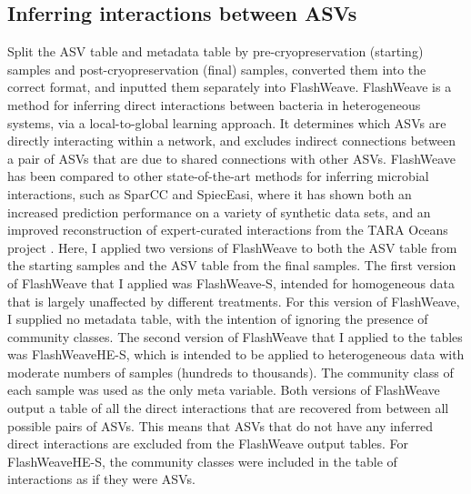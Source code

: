 \documentclass{article}
\begin{document}
\subsection{Inferring interactions between ASVs}
Split the ASV table and metadata table by pre-cryopreservation (starting) samples and post-cryopreservation (final) samples, converted them into the correct format, and inputted them separately into FlashWeave. FlashWeave is a method for inferring direct interactions between bacteria in heterogeneous systems, via a local-to-global learning approach. It determines which ASVs are directly interacting within a network, and excludes indirect connections between a pair of ASVs that are due to shared connections with other ASVs. FlashWeave has been compared to other state-of-the-art methods for inferring microbial interactions, such as SparCC and SpiecEasi, where it has shown both an increased prediction performance on a variety of synthetic data sets, and an improved reconstruction of expert-curated interactions from the TARA Oceans project \citep{TACKMANN2019286}. 
Here, I applied two versions of FlashWeave to both the ASV table from the starting samples and the ASV table from the final samples. The first version of FlashWeave that I applied was FlashWeave-S, intended for homogeneous data that is largely unaffected by different treatments. For this version of FlashWeave, I supplied no metadata table, with the intention of ignoring the presence of community classes. The second version of FlashWeave that I applied to the tables was FlashWeaveHE-S, which is intended to be applied to heterogeneous data with moderate numbers of samples (hundreds to thousands). The community class of each sample was used as the only meta variable. 
Both versions of FlashWeave output a table of all the direct interactions that are recovered from between all possible pairs of ASVs. This means that ASVs that do not have any inferred direct interactions are excluded from the FlashWeave output tables. For FlashWeaveHE-S, the community classes were included in the table of interactions as if they were ASVs.
\end{document}
